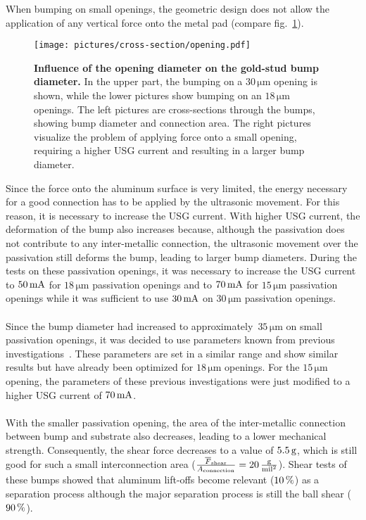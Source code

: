 When bumping on small openings, the geometric design does not allow the application of any vertical force onto the metal pad (compare fig.~\ref{fig:opening}).
\begin{figure}
\begin{center}
\texttt{[image: pictures/cross-section/opening.pdf]}
\end{center}
\caption[Influence of the opening diameter onto the gold-stud bump diameter]{\textbf{Influence of the opening diameter on the gold-stud bump diameter.} In the upper part, the bumping on a $30\,\si{\micro \meter}$ opening is shown, while the lower pictures show bumping on an $18\,\si{\micro \meter}$ openings. The left pictures are cross-sections through the bumps, showing bump diameter and connection area. The right pictures visualize the problem of applying force onto a small opening, requiring a higher \ac{USG} current and resulting in a larger bump diameter.}\label{fig:opening}
\end{figure}
Since the force onto the aluminum surface is very limited, the energy necessary for a good connection has to be applied by the ultrasonic movement. For this reason, it is necessary to increase the \ac{USG} current. With higher \ac{USG} current, the deformation of the bump also increases because, although the passivation does not contribute to any inter-metallic connection, the ultrasonic movement over the passivation still deforms the bump, leading to larger bump diameters. During the tests on these passivation openings, it was necessary to increase the \ac{USG} current to $50\,\rm{mA}$ for $18\,\si{\micro \meter}$ passivation openings and to $70\,\rm{mA}$ for $15\,\si{\micro \meter}$ passivation openings while it was sufficient to use $30\,\rm{mA}$ on $30\,\si{\micro \meter}$ passivation openings.
\\
\\
Since the bump diameter had increased to approximately~$35\,\si{\micro \meter}$ on small passivation openings, it was decided to use parameters known from previous investigations~\cite{Hei12}. These parameters are set in a similar range and show similar results but have already been optimized for $18\,\si{\micro \meter}$ openings. For the $15\,\si{\micro \meter}$ opening, the parameters of these previous investigations were just modified to a higher \ac{USG} current of $70\,\rm{}mA$.
\\
\\
With the smaller passivation opening, the area of the inter-metallic connection between bump and substrate also decreases, leading to a lower mechanical strength. Consequently, the shear force decreases to a value of $5.5\,\rm{g}$, which is still good for such a small interconnection area ($\frac{\overline{F}_{\rm{shear}}}{A_{\rm{connection}}}=20\,\frac{\rm{g}}{\rm{mil}^2}$). Shear tests of these bumps showed that aluminum lift-offs become relevant ($10\,\rm{\%}$) as a separation process although the major separation process is still the ball shear ($90\,\rm{\%}$).

